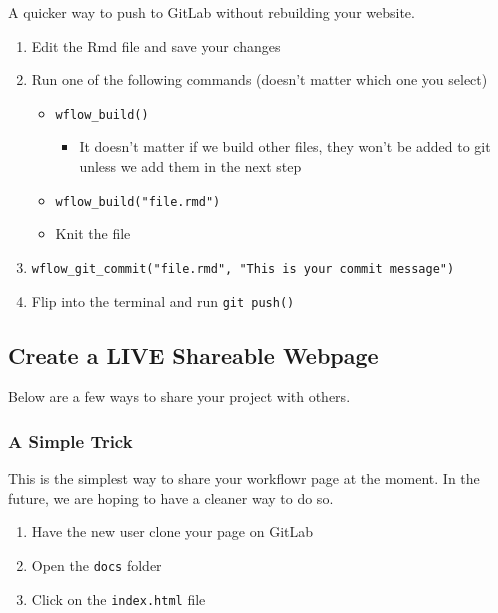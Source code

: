 \documentclass[openany]{book}
\providecommand{\tightlist}{%
  \setlength{\itemsep}{0pt}\setlength{\parskip}{0pt}}
\begin{document}
A quicker way to push to GitLab without rebuilding your website.

\begin{enumerate}
\def\labelenumi{\arabic{enumi}.}
\tightlist
\item
  Edit the Rmd file and save your changes
\item
  Run one of the following commands (doesn't matter which one you select)

  \begin{itemize}
  \tightlist
  \item
    \texttt{wflow\_build()}

    \begin{itemize}
    \tightlist
    \item
      It doesn't matter if we build other files, they won't be added to git unless we add them in the next step
    \end{itemize}
  \item
    \texttt{wflow\_build("file.rmd")}
  \item
    Knit the file
  \end{itemize}
\item
  \texttt{wflow\_git\_commit("file.rmd",\ "This\ is\ your\ commit\ message")}
\item
  Flip into the terminal and run \texttt{git\ push()}
\end{enumerate}

\hypertarget{create-a-live-shareable-webpage}{%
\subsection{Create a LIVE Shareable Webpage}\label{create-a-live-shareable-webpage}}

Below are a few ways to share your project with others.

\hypertarget{a-simple-trick}{%
\subsubsection{A Simple Trick}\label{a-simple-trick}}

This is the simplest way to share your workflowr page at the moment. In the future, we are hoping to have a cleaner way to do so.

\begin{enumerate}
\def\labelenumi{\arabic{enumi}.}
\tightlist
\item
  Have the new user clone your page on GitLab
\item
  Open the \texttt{docs} folder
\item
  Click on the \texttt{index.html} file
\end{enumerate}
\end{document}
